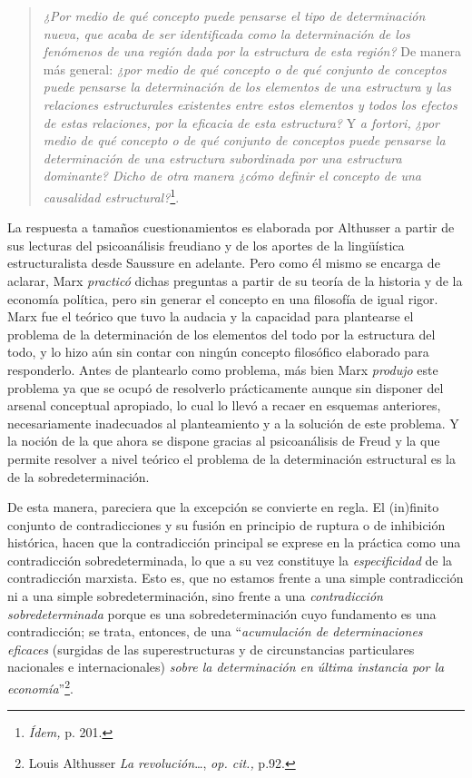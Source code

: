 \begin{quote}
\emph{¿Por medio de qué concepto puede pensarse el tipo de determinación nueva, que acaba de ser identificada como la determinación de los fenómenos de una región dada por la estructura de esta región?} De manera más general: \emph{¿por medio de qué concepto o de qué conjunto de conceptos puede pensarse la determinación de los elementos de una estructura y las relaciones estructurales existentes entre estos elementos y todos los efectos de estas relaciones, por la eficacia de esta estructura?} Y \emph{a fortori,} \emph{¿por medio de qué concepto o de qué conjunto de conceptos puede pensarse la determinación de una estructura subordinada por una estructura dominante? Dicho de otra manera ¿cómo definir el concepto de una causalidad estructural?}\footnote{\emph{Ídem,} p. 201.}.
\end{quote}

La respuesta a tamaños cuestionamientos es elaborada por Althusser a partir de sus lecturas del psicoanálisis freudiano y de los aportes de la lingüística estructuralista desde Saussure en adelante. Pero como él mismo se encarga de aclarar, Marx \emph{practicó} dichas preguntas a partir de su teoría de la historia y de la economía política, pero sin generar el concepto en una filosofía de igual rigor. Marx fue el teórico que tuvo la audacia y la capacidad para plantearse el problema de la determinación de los elementos del todo por la estructura del todo, y lo hizo aún sin contar con ningún concepto filosófico elaborado para responderlo. Antes de plantearlo como problema, más bien Marx \emph{produjo} este problema ya que se ocupó de resolverlo prácticamente aunque sin disponer del arsenal conceptual apropiado, lo cual lo llevó a recaer en esquemas anteriores, necesariamente inadecuados al planteamiento y a la solución de este problema. Y la noción de la que ahora se dispone gracias al psicoanálisis de Freud y la que permite resolver a nivel teórico el problema de la determinación estructural es la de la sobredeterminación.

De esta manera, pareciera que la excepción se convierte en regla. El (in)finito conjunto de contradicciones y su fusión en principio de ruptura o de inhibición histórica, hacen que la contradicción principal se exprese en la práctica como una contradicción sobredeterminada, lo que a su vez constituye la \emph{especificidad} de la contradicción marxista. Esto es, que no estamos frente a una simple contradicción ni a una simple sobredeterminación, sino frente a una \emph{contradicción sobredeterminada} porque es una sobredeterminación cuyo fundamento es una contradicción; se trata, entonces, de una \enquote{\emph{acumulación de determinaciones eficaces} (surgidas de las superestructuras y de circunstancias particulares nacionales e internacionales) \emph{sobre la determinación en última instancia por la economía}}\footnote{Louis Althusser \emph{La revolución}\ldots, \emph{op. cit.,} p.92.}.

